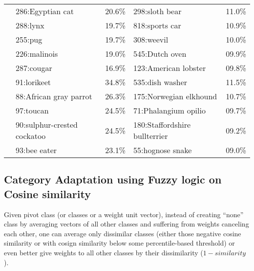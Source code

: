 \begin{table*}
\begin{tabularx}{\textwidth}{lXrXr}
 & 286:Egyptian cat & 20.6\% & 298:sloth bear & 11.0\% \\
 & 288:lynx & 19.7\% & 818:sports car & 10.9\% \\
 & 255:pug & 19.7\% & 308:weevil & 10.0\% \\
 & 226:malinois & 19.0\% & 545:Dutch oven & 09.9\% \\
 & 287:cougar & 16.9\% & 123:American lobster & 09.8\% \\
\midrule
{} & 91:lorikeet & 34.8\% & 535:dish washer & 11.5\% \\
 & 88:African gray parrot & 26.3\% & 175:Norwegian elkhound & 10.7\% \\
 & 97:toucan & 24.5\% & 71:Phalangium opilio & 09.7\% \\
 & 90:sulphur-crested cockatoo & 24.5\% & 180:Staffordshire bullterrier & 09.2\% \\
 & 93:bee eater & 23.1\% & 55:hognose snake & 09.0\% \\
\bottomrule
\end{tabularx}
\end{table*}

\subsection{Category Adaptation using Fuzzy logic on Cosine similarity}

Given pivot class (or classes or a weight unit vector),
instead of creating ``none'' class by averaging vectors of all other classes
and suffering from weights canceling each other,
one can average only dissimilar classes
(either those negative cosine similarity or with cosign similarity below some percentile-based threshold)
or even better give weights to all other classes by their dissimilarity (\(1-similarity\)).


